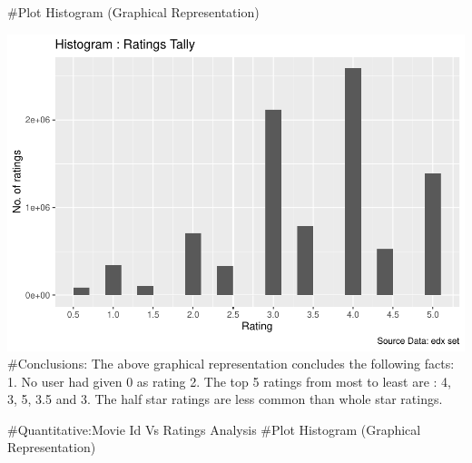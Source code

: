 \documentclass[
]{article}
\newenvironment{Shaded}{\begin{snugshade}}{\end{snugshade}}
\newcommand{\DataTypeTok}[1]{\textcolor[rgb]{0.13,0.29,0.53}{#1}}
\newcommand{\DecValTok}[1]{\textcolor[rgb]{0.00,0.00,0.81}{#1}}
\newcommand{\FloatTok}[1]{\textcolor[rgb]{0.00,0.00,0.81}{#1}}
\newcommand{\KeywordTok}[1]{\textcolor[rgb]{0.13,0.29,0.53}{\textbf{#1}}}
\newcommand{\NormalTok}[1]{#1}
\newcommand{\OperatorTok}[1]{\textcolor[rgb]{0.81,0.36,0.00}{\textbf{#1}}}
\newcommand{\StringTok}[1]{\textcolor[rgb]{0.31,0.60,0.02}{#1}}
\begin{document}
\#Plot Histogram (Graphical Representation)

\begin{Shaded}
\end{Shaded}

\includegraphics{MovieLensProjectReport_files/figure-latex/ratings Graphical Representation-1.pdf}
\#Conclusions: The above graphical representation concludes the
following facts: 1. No user had given 0 as rating 2. The top 5 ratings
from most to least are : 4, 3, 5, 3.5 and 3. The half star ratings are
less common than whole star ratings.

\#Quantitative:Movie Id Vs Ratings Analysis \#Plot Histogram (Graphical
Representation)
\end{document}
